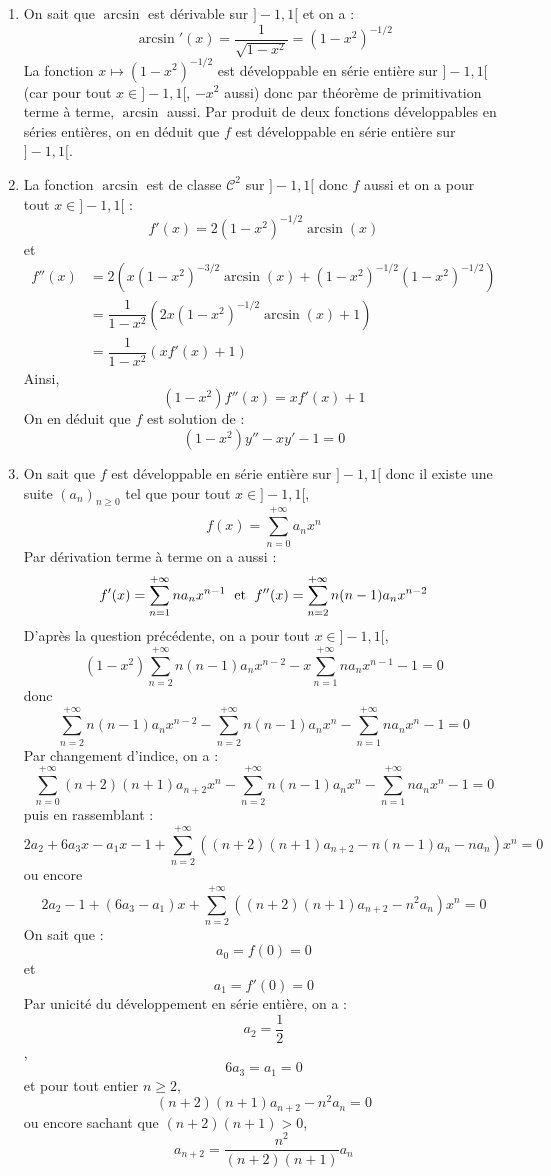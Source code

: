 \documentclass[a4paper,10pt]{report}
\begin{document}
\begin{enumerate}
\item On sait que $\arcsin$ est dérivable sur $]-1,1[$ et on a :
$$ \arcsin'(x) = \dfrac{1}{\sqrt{1-x^2}} = (1-x^2)^{-1/2}$$
La fonction $x \mapsto (1-x^2)^{-1/2}$ est développable en série entière sur $]-1,1[$ (car pour tout $x \in ]-1,1[$, $-x^2$ aussi) donc par théorème de primitivation terme à terme, $\arcsin$ aussi. Par produit de deux fonctions développables en séries entières, on en déduit que $f$ est développable en série entière sur $]-1,1[$.
\item La fonction $\arcsin$ est de classe $\mathcal{C}^2$ sur $]-1,1[$ donc $f$ aussi et on a pour tout $x \in ]-1,1[$ :
$$ f'(x) =  2 (1-x^2)^{-1/2} \arcsin(x)$$
et 
\begin{align*}
f''(x) & = 2 ( x (1-x^2)^{-3/2} \arcsin(x) + (1-x^2)^{-1/2} (1-x^2)^{-1/2}) \\
& = \dfrac{1}{1-x^2} \left( 2x (1-x^2)^{-1/2} \arcsin(x) + 1 \right) \\
& = \dfrac{1}{1-x^2} \left( xf'(x) + 1 \right) 
\end{align*}
Ainsi,
$$ (1-x^2) f''(x) = xf'(x)+1$$
On en déduit que $f$ est solution de :
$$ (1-x^2)y''-xy'-1=0$$
\item On sait que $f$ est développable en série entière sur $]-1,1[$ donc il existe une suite $(a_n)_{n \geq 0}$ tel que pour tout $x \in ]-1,1[$,
$$ f(x)= \sum_{n=0}^{+ \infty} a_n x^n$$
Par dérivation terme à terme on a aussi :
$$ f'(x) = \sum_{n=1}^{+ \infty} n a_n x^{n-1} \; \hbox{ et } \; f''(x) = \sum_{n=2}^{+ \infty} n(n-1) a_n x^{n-2}$$
D'après la question précédente, on a pour tout $x \in ]-1,1[$,
$$ (1-x^2) \sum_{n=2}^{+ \infty} n(n-1) a_n x^{n-2} - x \sum_{n=1}^{+ \infty} n a_n x^{n-1} - 1 = 0$$
donc
$$ \sum_{n=2}^{+ \infty} n(n-1) a_n x^{n-2} - \sum_{n=2}^{+ \infty} n(n-1) a_n x^{n} - \sum_{n=1}^{+ \infty} n a_n x^{n}-1 =0$$
Par changement d'indice, on a :
$$ \sum_{n=0}^{+ \infty} (n+2)(n+1) a_{n+2} x^{n} - \sum_{n=2}^{+ \infty} n(n-1) a_n x^{n} - \sum_{n=1}^{+ \infty} n a_n x^{n}-1 =0$$
puis en rassemblant :
$$ 2a_2+6a_3x  -a_1x-1 + \sum_{n=2}^{+ \infty} ((n+2)(n+1) a_{n+2} - n(n-1) a_n - n a_n)x^n = 0$$
ou encore 
$$ 2a_2-1 + (6a_3-a_1) x  + \sum_{n=2}^{+ \infty} ((n+2)(n+1) a_{n+2} - n^2 a_n)x^n = 0$$
On sait que :
$$ a_0 = f(0) = 0$$
et 
$$ a_1 = f'(0) = 0$$
Par unicité du développement en série entière, on a :
$$ a_2 = \dfrac{1}{2}$$,
$$ 6a_3 = a_1 = 0$$
et pour tout entier $n \geq 2$,
$$ (n+2)(n+1) a_{n+2} - n^2 a_n = 0$$
ou encore sachant que $(n+2)(n+1)>0$,
$$ a_{n+2} = \dfrac{n^2}{(n+2)(n+1)} a_n$$

\end{enumerate}
\end{document}
